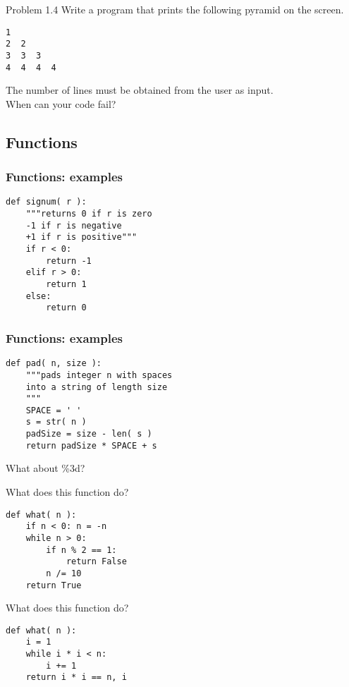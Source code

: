 \documentclass[14pt,compress]{beamer}
\newcounter{time}
\newcommand{\inctime}[1]{\addtocounter{time}{#1}{\tiny \thetime\ m}}
\begin{document}
\begin{frame}[fragile]{Problem 1.4}
  Write a program that prints the following pyramid on the screen. 
  \begin{lstlisting}
1
2  2
3  3  3
4  4  4  4
  \end{lstlisting}
The number of lines must be obtained from the user as input.\\
\pause
When can your code fail?
\only<2->{\inctime{25}}
\end{frame}


\subsection{Functions}
\begin{frame}[fragile]
\frametitle{Functions: examples}
  \begin{lstlisting}
def signum( r ):
    """returns 0 if r is zero
    -1 if r is negative
    +1 if r is positive"""
    if r < 0:
        return -1
    elif r > 0:
        return 1
    else:
        return 0
  \end{lstlisting}
\end{frame}

\begin{frame}[fragile]
  \frametitle{Functions: examples}
  \begin{lstlisting}
def pad( n, size ): 
    """pads integer n with spaces
    into a string of length size
    """
    SPACE = ' '
    s = str( n )
    padSize = size - len( s )
    return padSize * SPACE + s
  \end{lstlisting}
\pause
What about \%3d?
\end{frame}

\begin{frame}[fragile]
  {What does this function do?}
  \begin{lstlisting}
def what( n ):
    if n < 0: n = -n
    while n > 0:
        if n % 2 == 1:
            return False
        n /= 10
    return True
  \end{lstlisting}
\end{frame}

\begin{frame}[fragile]
  {What does this function do?}
\begin{lstlisting}
def what( n ):
    i = 1    
    while i * i < n:
        i += 1
    return i * i == n, i
  \end{lstlisting}
\end{frame}
\end{document}
